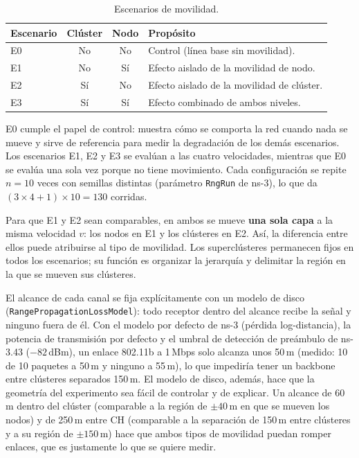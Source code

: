 \begin{table}[h]
\centering
\small
\begin{tabular}{lccp{6.2cm}}
\toprule
\textbf{Escenario} & \textbf{Clúster} & \textbf{Nodo} & \textbf{Propósito} \\
\midrule
E0 & No & No & Control (línea base sin movilidad). \\
E1 & No & Sí & Efecto aislado de la movilidad de nodo. \\
E2 & Sí & No & Efecto aislado de la movilidad de clúster. \\
E3 & Sí & Sí & Efecto combinado de ambos niveles. \\
\bottomrule
\end{tabular}
\caption{Escenarios de movilidad.}
\label{tab:escenarios}
\end{table}

E0 cumple el papel de control: muestra cómo se comporta la red cuando nada se mueve y
sirve de referencia para medir la degradación de los demás escenarios. Los escenarios
E1, E2 y E3 se evalúan a las cuatro velocidades, mientras que E0 se evalúa una sola vez
porque no tiene movimiento. Cada configuración se repite $n = 10$ veces con semillas
distintas (parámetro \texttt{RngRun} de ns-3), lo que da
$(3 \times 4 + 1) \times 10 = 130$ corridas.

Para que E1 y E2 sean comparables, en ambos se mueve \textbf{una sola capa} a la misma
velocidad $v$: los nodos en E1 y los clústeres en E2. Así, la diferencia entre ellos puede atribuirse al tipo de movilidad. Los superclústeres permanecen fijos
en todos los escenarios; su función es organizar la jerarquía y delimitar la región en la
que se mueven sus clústeres.

El alcance de cada canal se fija explícitamente con un modelo de disco
(\texttt{Range\allowbreak{}Propagation\allowbreak{}LossModel}): todo receptor dentro del alcance recibe la señal y
ninguno fuera de él. Con el modelo por defecto de ns-3 (pérdida log-distancia), la
potencia de transmisión por defecto y el umbral de detección de preámbulo de ns-3.43
($-82$\,dBm), un enlace 802.11b a 1\,Mbps solo alcanza unos 50\,m (medido: 10 de 10
paquetes a 50\,m y ninguno a 55\,m), lo que impediría tener un backbone entre clústeres
separados 150\,m. El modelo de disco, además, hace que la geometría del experimento sea
fácil de controlar y de explicar. Un alcance de 60\,m dentro del clúster (comparable
a la región de $\pm 40$\,m en que se mueven los nodos) y de 250\,m entre CH (comparable a
la separación de 150\,m entre clústeres y a su región de $\pm 150$\,m) hace que ambos
tipos de movilidad puedan romper enlaces, que es justamente lo que se quiere medir.


